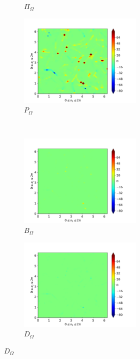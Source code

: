 \begin{figure}[H]
\begin{subfigure}{0.45\textwidth}
        \caption{$\Pi_{\Omega}$}
    \end{subfigure}
    \newline
    \begin{subfigure}{0.45\textwidth}
        \includegraphics[height=1.75in]{media/run-cds-65/P-enst-1330}
        \caption{$P_{\Omega}$}
    \end{subfigure}
    ~
    \begin{subfigure}{0.45\textwidth}
        \includegraphics[height=1.75in]{media/run-cds-65/B-enst-1330}
        \caption{$B_{\Omega}$}
    \end{subfigure}
    \newline
    \begin{subfigure}{0.45\textwidth}
        \includegraphics[height=1.75in]{media/run-cds-65/D-enst-1330}
        \caption{$D_{\Omega}$}
    \end{subfigure}
\end{figure}

\newpage

